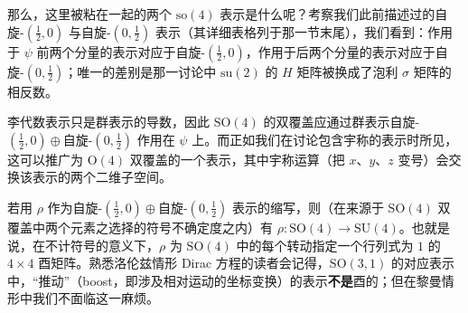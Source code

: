 那么，这里被粘在一起的两个 $\mathrm{so}(4)$ 表示是什么呢？考察我们此前描述过的自旋-$(\tfrac12,0)$ 与自旋-$(0,\tfrac12)$ 表示（其详细表格列于那一节末尾），我们看到：作用于 $\psi$ 前两个分量的表示对应于自旋-$(\tfrac12,0)$，作用于后两个分量的表示对应于自旋-$(0,\tfrac12)$；唯一的差别是那一讨论中 $\mathrm{su}(2)$ 的 $H$ 矩阵被换成了泡利 $\sigma$ 矩阵的相反数。

李代数表示只是群表示的导数，因此 $\mathrm{SO}(4)$ 的双覆盖应通过群表示自旋-$(\tfrac12,0)\oplus$自旋-$(0,\tfrac12)$ 作用在 $\psi$ 上。而正如我们在讨论包含宇称的表示时所见，这可以推广为 $\mathrm{O}(4)$ 双覆盖的一个表示，其中宇称运算（把 $x$、$y$、$z$ 变号）会交换该表示的两个二维子空间。

若用 $\rho$ 作为自旋-$(\tfrac12,0)\oplus$自旋-$(0,\tfrac12)$ 表示的缩写，则（在来源于 $\mathrm{SO}(4)$ 双覆盖中两个元素之选择的符号不确定度之内）有 $\rho:\mathrm{SO}(4)\to\mathrm{SU}(4)$。也就是说，在不计符号的意义下，$\rho$ 为 $\mathrm{SO}(4)$ 中的每个转动指定一个行列式为 $1$ 的 $4\times4$ 酉矩阵。熟悉洛伦兹情形 Dirac 方程的读者会记得，$\mathrm{SO}(3,1)$ 的对应表示中，“推动”（boost，即涉及相对运动的坐标变换）的表示\textbf{不是}酉的；但在黎曼情形中我们不面临这一麻烦。

